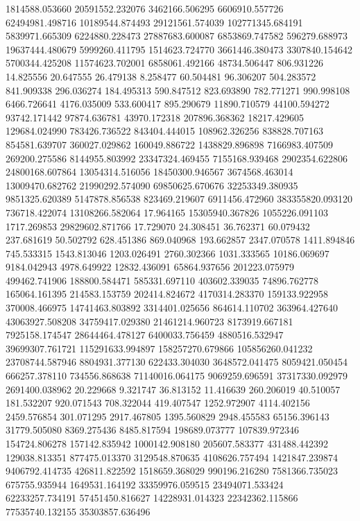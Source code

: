 1814588.053660
20591552.232076
3462166.506295
6606910.557726
62494981.498716
10189544.874493
29121561.574039
102771345.684191
5839971.665309
6224880.228473
27887683.600087
6853869.747582
596279.688973
19637444.480679
5999260.411795
1514623.724770
3661446.380473
3307840.154642
5700344.425208
11574623.702001
6858061.492166
48734.506447
806.931226
14.825556
20.647555
26.479138
8.258477
60.504481
96.306207
504.283572
841.909338
296.036274
184.495313
590.847512
823.693890
782.771271
990.998108
6466.726641
4176.035009
533.600417
895.290679
11890.710579
44100.594272
93742.171442
97874.636781
43970.172318
207896.368362
18217.429605
129684.024990
783426.736522
843404.444015
108962.326256
838828.707163
854581.639707
360027.029862
160049.886722
1438829.896898
7166983.407509
269200.275586
8144955.803992
23347324.469455
7155168.939468
2902354.622806
24800168.607864
13054314.516056
18450300.946567
3674568.463014
13009470.682762
21990292.574090
69850625.670676
32253349.380935
9851325.620389
5147878.856538
823469.219607
6911456.472960
383355820.093120
736718.422074
13108266.582064
17.964165
15305940.367826
1055226.091103
1717.269853
29829602.871766
17.729070
24.308451
36.762371
60.079432
237.681619
50.502792
628.451386
869.040968
193.662857
2347.070578
1411.894846
745.533315
1543.813046
1203.026491
2760.302366
1031.333565
10186.069697
9184.042943
4978.649922
12832.436091
65864.937656
201223.075979
499462.741906
188800.584471
585331.697110
403602.339035
74896.762778
165064.161395
214583.153759
202414.824672
4170314.283370
159133.922958
370008.466975
14741463.803892
3314401.025656
864614.110702
363964.427640
43063927.508208
34759417.029380
21461214.960723
8173919.667181
7925158.174547
28644464.478127
6400033.756459
4880516.532947
39699307.761721
115291633.994897
158257270.679866
105856260.041232
23708744.587946
8804931.377130
622433.304030
3648572.041475
8059421.050454
666257.378110
734556.868638
71140016.064175
9069259.696591
37317330.092979
2691400.038962
20.229668
9.321747
36.813152
11.416639
260.206019
40.510057
181.532207
920.071543
708.322044
419.407547
1252.972907
4114.402156
2459.576854
301.071295
2917.467805
1395.560829
2948.455583
65156.396143
31779.505080
8369.275436
8485.817594
198689.073777
107839.972346
154724.806278
157142.835942
1000142.908180
205607.583377
431488.442392
129038.813351
877475.013370
3129548.870635
4108626.757494
1421847.239874
9406792.414735
426811.822592
1518659.368029
990196.216280
7581366.735023
675755.935944
1649531.164192
33359976.059515
23494071.533424
62233257.734191
57451450.816627
14228931.014323
22342362.115866
77535740.132155
35303857.636496
